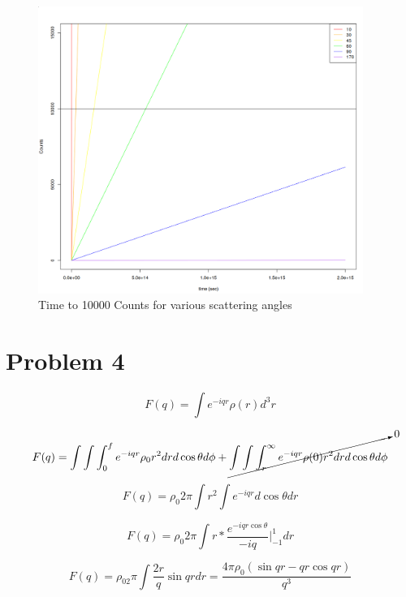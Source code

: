 \documentclass[12pt]{article}
\begin{document}
\begin{figure}[h]
  \centering
  \includegraphics[width=300pt]{code/p3graph.png}
  \caption{Time to 10000 Counts for various scattering angles}
\end{figure}

\newpage

\section{Problem 4}

\begin{equation}
  F(q)=\int e^{-iqr}\rho(r)d^3r
\end{equation}

\begin{equation}
  F(q)= \int\int\int_0^f e^{-iqr}\rho_0r^2drd\cos\theta d\phi +\cancelto{0}{\int\int\int_r^\infty e^{-iqr}\rho(0)r^2drd\cos\theta d\phi }
\end{equation}

\begin{equation}
  F(q)= \rho_0 2\pi\int r^2\int e^{-iqr}d\cos\theta dr
\end{equation}

\begin{equation}
  F(q)= \rho_0 2\pi\int r * \frac{e^{-iqr\cos\theta}}{-iq}\rvert_{-1}^{1} dr
\end{equation}

\begin{equation}
  F(q)= \rho_02\pi\int \frac{2r}{q}\sin{qr} dr=\frac{4\pi\rho_0(\sin{qr}-qr\cos{qr})}{q^3}
\end{equation}
\end{document}
